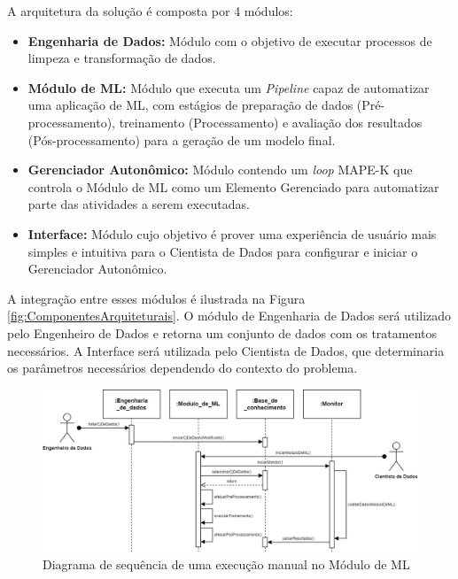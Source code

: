 \documentclass[portugues]{ic-tese}
\begin{document}
A arquitetura da solução é composta por 4 módulos:

\begin{itemize}
    \item {\textbf{Engenharia de Dados:}} Módulo com o objetivo de executar processos de limpeza e transformação de dados.
	\item {\textbf{Módulo de ML:}} Módulo que executa um \textit{Pipeline} capaz de automatizar uma aplicação de ML, com estágios de preparação de dados (Pré-processamento), treinamento (Processamento) e avaliação dos resultados (Pós-processamento) para a geração de um modelo final.
     \item {\textbf{Gerenciador Autonômico:}} Módulo contendo um \textit{loop} MAPE-K que controla o Módulo de ML como um Elemento Gerenciado para automatizar parte das atividades a serem executadas.
     \item {\textbf{Interface:}} Módulo cujo objetivo é prover uma experiência de usuário mais simples e intuitiva para o Cientista de Dados para configurar e iniciar o Gerenciador Autonômico.
\end{itemize}

A integração entre esses módulos é ilustrada na Figura \ref{fig:ComponentesArquiteturais}. O módulo de Engenharia de Dados será utilizado pelo Engenheiro de Dados e retorna um conjunto de dados com os tratamentos necessários. A Interface será utilizada pelo Cientista de Dados, que determinaria os parâmetros necessários dependendo do contexto do problema. 

\begin{figure}[h]
\centering
\includegraphics[scale=0.375]{images/Diagrama_Sequencia_Manual.jpg}
\caption {Diagrama de sequência de uma execução manual no Módulo de ML}
\label{fig:DiagramaSequenciaManual}
\end{figure}
\end{document}
